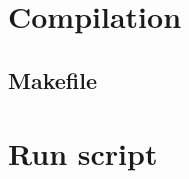 \section{Compilation}
\label{app:compile}


\subsection{Makefile}
\label{app:makefile}


\section{Run script}
\label{app:run}







